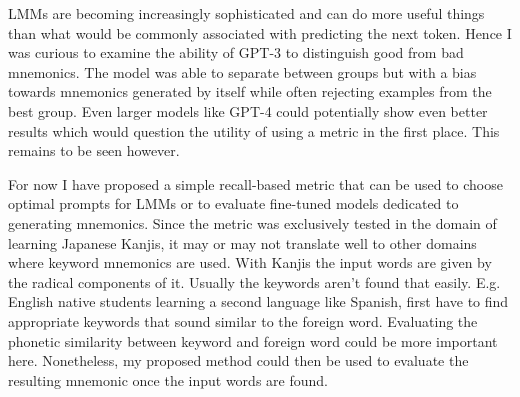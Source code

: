 LMMs are becoming increasingly sophisticated and can do more useful things than what would be commonly associated with predicting the next token. Hence I was curious to examine the ability of GPT-3 to distinguish good from bad mnemonics. The model was able to separate between groups but with a bias towards mnemonics generated by itself while often rejecting examples from the best group. Even larger models like GPT-4 could potentially show even better results which would question the utility of using a metric in the first place. This remains to be seen however.

For now I have proposed a simple recall-based metric that can be used to choose optimal prompts for LMMs or to evaluate fine-tuned models dedicated to generating mnemonics. Since the metric was exclusively tested in the domain of learning Japanese Kanjis, it may or may not translate well to other domains where keyword mnemonics are used. With Kanjis the input words are given by the radical components of it. Usually the keywords aren't found that easily. E.g. English native students learning a second language like Spanish, first have to find appropriate keywords that sound similar to the foreign word. Evaluating the phonetic similarity between keyword and foreign word could be more important here.
Nonetheless, my proposed method could then be used to evaluate the resulting mnemonic once the input words are found.   


